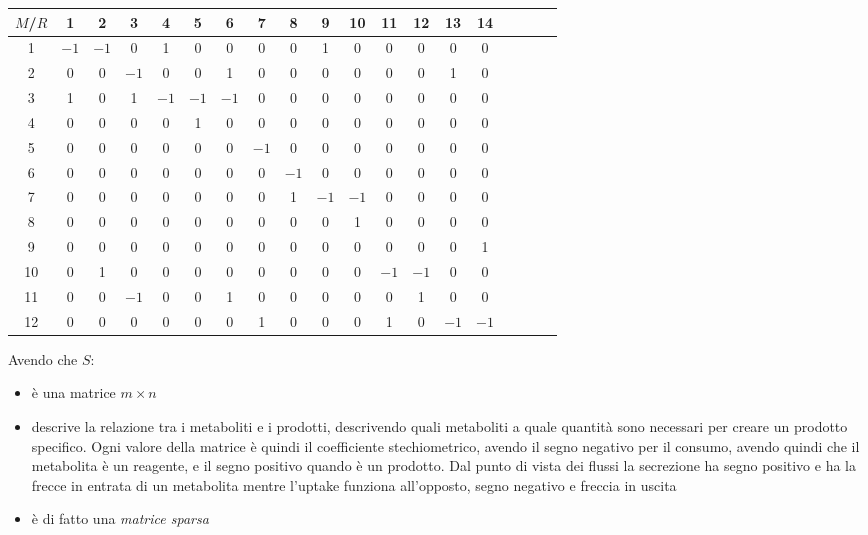 \documentclass[a4paper,12pt, oneside]{book}
\begin{document}
\begin{table}[H]
  \footnotesize
  \centering
  \begin{tabular}{c|c|c|c|c|c|c|c|c|c|c|c|c|c|c|c|c|c|c} 
    $M$/$R$& 1 & 2 & 3 & 4 & 5 & 6 & 7 & 8 & 9 & 10 & 11 & 12 & 13 & 14 \\
    \hline 1 & $-1$ & $-1$ & 0 & 1 & 0 & 0 & 0 & 0 & 1 & 0 & 0 & 0 & 0 & 0 \\
    \hline 2 & 0 & 0 & $-1$ & 0 & 0 & 1 & 0 & 0 & 0 & 0 & 0 & 0 & 1 & 0 \\
    \hline 3 & 1 & 0 & 1 & $-1$ & $-1$ & $-1$ & 0 & 0 & 0 & 0 & 0 & 0 & 0 & 0 \\
    \hline 4 & 0 & 0 & 0 & 0 & 1 & 0 & 0 & 0 & 0 & 0 & 0 & 0 & 0 & 0 \\
    \hline 5 & 0 & 0 & 0 & 0 & 0 & 0 & $-1$ & 0 & 0 & 0 & 0 & 0 & 0 & 0 \\
    \hline 6 & 0 & 0 & 0 & 0 & 0 & 0 & 0 & $-1$ & 0 & 0 & 0 & 0 & 0 & 0 \\
    \hline 7 & 0 & 0 & 0 & 0 & 0 & 0 & 0 & 1 & $-1$ & $-1$ & 0 & 0 & 0 & 0 \\
    \hline 8 & 0 & 0 & 0 & 0 & 0 & 0 & 0 & 0 & 0 & 1 & 0 & 0 & 0 & 0 \\
    \hline 9 & 0 & 0 & 0 & 0 & 0 & 0 & 0 & 0 & 0 & 0 & 0 & 0 & 0 & 1 \\
    \hline 10 & 0 & 1 & 0 & 0 & 0 & 0 & 0 & 0 & 0 & 0 & $-1$ & $-1$ & 0 & 0 \\
    \hline 11 & 0 & 0 & $-1$ & 0 & 0 & 1 & 0 & 0 & 0 & 0 & 0 & 1 & 0 & 0 \\
    \hline 12 & 0 & 0 & 0 & 0 & 0 & 0 & 1 & 0 & 0 & 0 & 1 & 0 & $-1$ & $-1$ \\
  \end{tabular}
\end{table}
Avendo che $S$:
\begin{itemize}
  \item è una matrice $m\times n$
  \item descrive la relazione tra i metaboliti e i prodotti, descrivendo quali
  metaboliti a quale quantità sono necessari per creare un prodotto
  specifico. Ogni valore della matrice è quindi il coefficiente stechiometrico,
  avendo il segno negativo per il consumo, avendo quindi che il metabolita è un
  reagente, e il segno positivo quando è un prodotto. Dal punto di vista dei
  flussi la secrezione ha segno positivo e ha la frecce in entrata di un
  metabolita mentre l'uptake funziona all'opposto, segno negativo e freccia in
  uscita 
  \item è di fatto una \textit{matrice sparsa}
\end{itemize}
\end{document}
